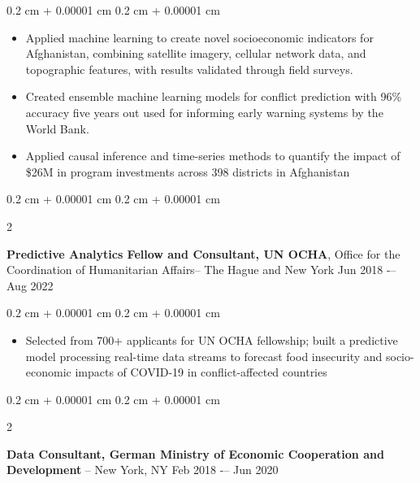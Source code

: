 \documentclass[10pt, letterpaper]{article}
\newenvironment{highlights}{
    \begin{itemize}[
        topsep=0.10 cm,
        parsep=0.10 cm,
        partopsep=0pt,
        itemsep=0pt,
        leftmargin=0.4 cm + 10pt
    ]
}{
    \end{itemize}
} %
\newenvironment{onecolentry}{
    \begin{adjustwidth}{
        0.2 cm + 0.00001 cm
    }{
        0.2 cm + 0.00001 cm
    }
}{
    \end{adjustwidth}
} %
\newenvironment{twocolentry}[2][]{
    \onecolentry
    \def\secondColumn{#2}
    \setcolumnwidth{\fill, 4.5 cm}
    \begin{paracol}{2}
}{
    \switchcolumn \raggedleft \secondColumn
    \end{paracol}
    \endonecolentry
} %
\begin{document}
       
        \begin{onecolentry}
            \begin{highlights}
            \vspace{0.05 cm}
                \item Applied machine learning to create novel socioeconomic indicators for Afghanistan, combining satellite imagery, cellular network data, and topographic features, with results validated through field surveys.
                \item Created ensemble machine learning models for conflict prediction with 96\% accuracy five years out used for informing early warning systems by the World Bank.
                \item Applied causal inference and time-series methods to quantify the impact of \$26M in program investments across 398 districts in Afghanistan
            \end{highlights}
        \end{onecolentry}


     \vspace{0.10 cm}
        \begin{twocolentry}{
            Jun 2018 -– Aug 2022
        }
            \textbf{Predictive Analytics Fellow and Consultant, UN OCHA}, Office for the Coordination of Humanitarian Affairs-- The Hague and New York\end{twocolentry}

        \begin{onecolentry}
            \begin{highlights}
            \vspace{0.05 cm}
                \item Selected from 700+ applicants for UN OCHA fellowship; built a predictive model processing real-time data streams to forecast food insecurity and socio-economic impacts of COVID-19 in conflict-affected countries
         
            \end{highlights}
        \end{onecolentry}
        
\vspace{0.10 cm}
        \begin{twocolentry}{
            Feb 2018 -– Jun 2020
        }
            \textbf{Data Consultant, German Ministry of Economic Cooperation and Development}  -- New York, NY\end{twocolentry}
\end{document}
